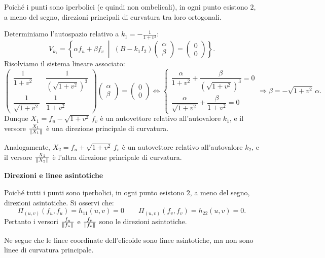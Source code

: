 \begin{esempio}[Elicoide]
        Poiché i punti sono iperbolici (e quindi non ombelicali), in ogni punto esistono $2$, a meno del segno, direzioni principali di curvatura tra loro ortogonali.

        Determiniamo l'autospazio relativo a $k_1 = -\frac{1}{1+v^2}$:
        \[
        V_{k_1} = \left\{ \alpha f_u + \beta f_v \;\middle|\; (B - k_1 I_2) \begin{pmatrix} \alpha \\ \beta \end{pmatrix} = \begin{pmatrix} 0 \\ 0 \end{pmatrix} \right\}.
        \]
        Risolviamo il sistema lineare associato:
        \[
        \begin{pmatrix}
        \dfrac{1}{1+v^2} & \dfrac{1}{(\sqrt{1+v^2})^3} \\[1em]
        \dfrac{1}{\sqrt{1+v^2}} & \dfrac{1}{1+v^2}
        \end{pmatrix}
        \begin{pmatrix}
        \alpha \\
        \beta
        \end{pmatrix}
        =
        \begin{pmatrix}
        0 \\
        0
        \end{pmatrix}
        \iff
        \begin{cases}
        \dfrac{\alpha}{1+v^2} + \dfrac{\beta}{(\sqrt{1+v^2})^3} = 0 \\[1em]
        \dfrac{\alpha}{\sqrt{1+v^2}} + \dfrac{\beta}{1+v^2} = 0
        \end{cases}
        \Rightarrow \beta = -\sqrt{1+v^2}\,\alpha.
        \]
        Dunque $X_1 = f_u - \sqrt{1+v^2}\,f_v$ è un autovettore relativo all'autovalore $k_1$, e il versore $\frac{X_1}{\lVert X_1\rVert}$ è una direzione principale di curvatura.

        Analogamente, $X_2 = f_u + \sqrt{1+v^2}\,f_v$ è un autovettore relativo all'autovalore $k_2$, e il versore $\frac{X_2}{\lVert X_2\rVert}$ è l'altra direzione principale di curvatura.

        \noindent\textbf{Direzioni e linee asintotiche}

        Poiché tutti i punti sono iperbolici, in ogni punto esistono $2$, a meno del segno, direzioni asintotiche. Si osservi che:
        \[
        \Pi_{(u,v)}(f_u, f_u) = h_{11}(u,v) = 0 \qquad \Pi_{(u,v)}(f_v, f_v) = h_{22}(u,v) = 0.
        \]
        Pertanto i versori $\frac{f_u}{\lVert f_u\rVert}$ e $\frac{f_v}{\lVert f_v\rVert}$ sono le direzioni asintotiche. 
        
        Ne segue che le linee coordinate dell'elicoide sono linee asintotiche, ma non sono linee di curvatura principale.
        \end{esempio}
        \newpage

